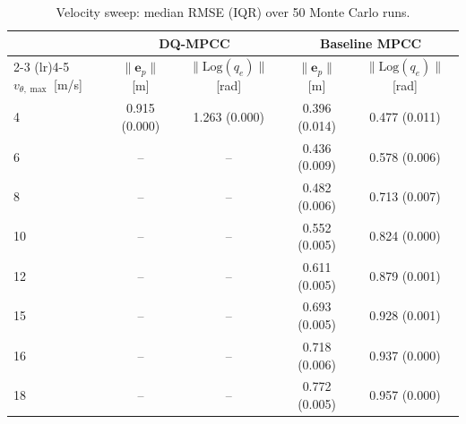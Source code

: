 \begin{table}[t]
  \centering
  \caption{Velocity sweep: median RMSE (IQR) over 50 Monte Carlo runs.}
  \label{tab:velocity_sweep}
  \setlength{\tabcolsep}{3pt}
  \begin{tabular}{l cc cc}
    \toprule
    & \multicolumn{2}{c}{\textbf{DQ-MPCC}}
    & \multicolumn{2}{c}{\textbf{Baseline MPCC}} \\
    \cmidrule(lr){2-3} \cmidrule(lr){4-5}
    $v_{\theta,\max}$ [m/s]
    & $\|\mathbf{e}_p\|$ [m] & $\|\mathrm{Log}(q_e)\|$ [rad]
    & $\|\mathbf{e}_p\|$ [m] & $\|\mathrm{Log}(q_e)\|$ [rad] \\
    \midrule
    4 & 0.915 (0.000) & 1.263 (0.000) & 0.396 (0.014) & 0.477 (0.011) \\
    6 & -- & -- & 0.436 (0.009) & 0.578 (0.006) \\
    8 & -- & -- & 0.482 (0.006) & 0.713 (0.007) \\
    10 & -- & -- & 0.552 (0.005) & 0.824 (0.000) \\
    12 & -- & -- & 0.611 (0.005) & 0.879 (0.001) \\
    15 & -- & -- & 0.693 (0.005) & 0.928 (0.001) \\
    16 & -- & -- & 0.718 (0.006) & 0.937 (0.000) \\
    18 & -- & -- & 0.772 (0.005) & 0.957 (0.000) \\
    \bottomrule
  \end{tabular}
\end{table}
